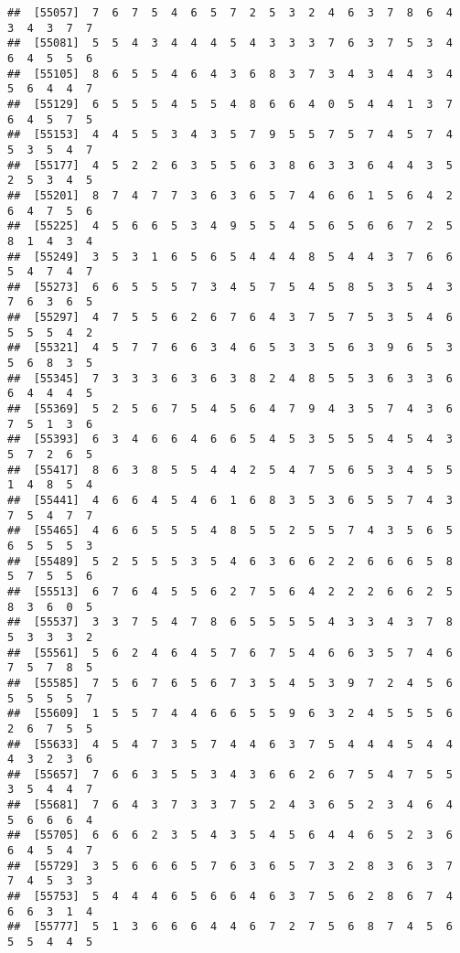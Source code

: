 \documentclass[
]{book}
\begin{document}
\begin{verbatim}
##  [55057]  7  6  7  5  4  6  5  7  2  5  3  2  4  6  3  7  8  6  4  3  4  3  7  7
##  [55081]  5  5  4  3  4  4  4  5  4  3  3  3  7  6  3  7  5  3  4  6  4  5  5  6
##  [55105]  8  6  5  5  4  6  4  3  6  8  3  7  3  4  3  4  4  3  4  5  6  4  4  7
##  [55129]  6  5  5  5  4  5  5  4  8  6  6  4  0  5  4  4  1  3  7  6  4  5  7  5
##  [55153]  4  4  5  5  3  4  3  5  7  9  5  5  7  5  7  4  5  7  4  5  3  5  4  7
##  [55177]  4  5  2  2  6  3  5  5  6  3  8  6  3  3  6  4  4  3  5  2  5  3  4  5
##  [55201]  8  7  4  7  7  3  6  3  6  5  7  4  6  6  1  5  6  4  2  6  4  7  5  6
##  [55225]  4  5  6  6  5  3  4  9  5  5  4  5  6  5  6  6  7  2  5  8  1  4  3  4
##  [55249]  3  5  3  1  6  5  6  5  4  4  4  8  5  4  4  3  7  6  6  5  4  7  4  7
##  [55273]  6  6  5  5  5  7  3  4  5  7  5  4  5  8  5  3  5  4  3  7  6  3  6  5
##  [55297]  4  7  5  5  6  2  6  7  6  4  3  7  5  7  5  3  5  4  6  5  5  5  4  2
##  [55321]  4  5  7  7  6  6  3  4  6  5  3  3  5  6  3  9  6  5  3  5  6  8  3  5
##  [55345]  7  3  3  3  6  3  6  3  8  2  4  8  5  5  3  6  3  3  6  6  4  4  4  5
##  [55369]  5  2  5  6  7  5  4  5  6  4  7  9  4  3  5  7  4  3  6  7  5  1  3  6
##  [55393]  6  3  4  6  6  4  6  6  5  4  5  3  5  5  5  4  5  4  3  5  7  2  6  5
##  [55417]  8  6  3  8  5  5  4  4  2  5  4  7  5  6  5  3  4  5  5  1  4  8  5  4
##  [55441]  4  6  6  4  5  4  6  1  6  8  3  5  3  6  5  5  7  4  3  7  5  4  7  7
##  [55465]  4  6  6  5  5  5  4  8  5  5  2  5  5  7  4  3  5  6  5  6  5  5  5  3
##  [55489]  5  2  5  5  5  3  5  4  6  3  6  6  2  2  6  6  6  5  8  5  7  5  5  6
##  [55513]  6  7  6  4  5  5  6  2  7  5  6  4  2  2  2  6  6  2  5  8  3  6  0  5
##  [55537]  3  3  7  5  4  7  8  6  5  5  5  5  4  3  3  4  3  7  8  5  3  3  3  2
##  [55561]  5  6  2  4  6  4  5  7  6  7  5  4  6  6  3  5  7  4  6  7  5  7  8  5
##  [55585]  7  5  6  7  6  5  6  7  3  5  4  5  3  9  7  2  4  5  6  5  5  5  5  7
##  [55609]  1  5  5  7  4  4  6  6  5  5  9  6  3  2  4  5  5  5  6  2  6  7  5  5
##  [55633]  4  5  4  7  3  5  7  4  4  6  3  7  5  4  4  4  5  4  4  4  3  2  3  6
##  [55657]  7  6  6  3  5  5  3  4  3  6  6  2  6  7  5  4  7  5  5  3  5  4  4  7
##  [55681]  7  6  4  3  7  3  3  7  5  2  4  3  6  5  2  3  4  6  4  5  6  6  6  4
##  [55705]  6  6  6  2  3  5  4  3  5  4  5  6  4  4  6  5  2  3  6  6  4  5  4  7
##  [55729]  3  5  6  6  6  5  7  6  3  6  5  7  3  2  8  3  6  3  7  7  4  5  3  3
##  [55753]  5  4  4  4  6  5  6  6  4  6  3  7  5  6  2  8  6  7  4  6  6  3  1  4
##  [55777]  5  1  3  6  6  6  4  4  6  7  2  7  5  6  8  7  4  5  6  5  5  4  4  5

\end{verbatim}
\end{document}
